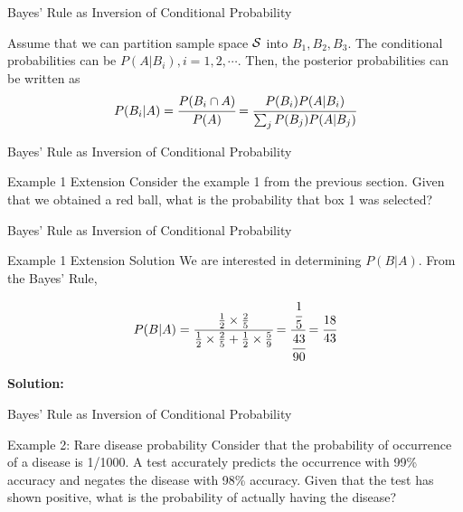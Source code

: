 \documentclass[aspectratio=169,xcolor=dvipsnames,svgnames,x11names,fleqn]{beamer}
\newcommand{\showanswers}{yes}
\begin{document}
    
    \begin{frame}[containsverbatim]{Bayes' Rule as Inversion of Conditional Probability}
    
    Assume that we can partition sample space ${\mathcal S}$ into $B_1, B_2, B_3$. The conditional probabilities can be $P(A|B_i), i = 1, 2, \cdots.$ Then, the posterior probabilities can be written as 
    \begin{equation}
        P(B_i | A) = \cfrac{P(B_i \cap A)}{P(A)} = \cfrac{P(B_i)P(A|B_i)}{\sum_j P(B_j)P(A|B_j)}
    \end{equation}

\end{frame}

\begin{frame}[containsverbatim]{Bayes' Rule as Inversion of Conditional Probability}
    
    \begin{exampleblock}{Example 1 Extension}
        Consider the example 1 from the previous section. Given that we obtained a red ball, what is the probability that box 1 was selected?
    \end{exampleblock}
    
\end{frame}

\begin{frame}[containsverbatim]{Bayes' Rule as Inversion of Conditional Probability}
    \ifthenelse{\equal{\showanswers}{yes}}
{
    \begin{examplesolution}{Example 1 Extension Solution}
        We are interested in determining $P(B|A)$. From the Bayes' Rule, 
    
        \begin{equation}
            P(B|A) = \cfrac{\frac{1}{2}\times \frac{2}{5}}{\frac{1}{2}\times \frac{2}{5} + \frac{1}{2}\times \frac{5}{9}} = \cfrac{\cfrac{1}{5}}{\cfrac{43}{90}} = \cfrac{18}{43}
        \end{equation}
    \end{examplesolution}
}{
    \textbf{Solution:} \color{LightGray}{Blank space for calculation}
}
\end{frame}

\begin{frame}[containsverbatim]{Bayes' Rule as Inversion of Conditional Probability}
    
    \begin{exampleblock}{Example 2: Rare disease probability}
        Consider that the probability of occurrence of a disease is 1/1000. A test accurately predicts the occurrence with 99\% accuracy and negates the disease with 98\% accuracy. Given that the test has shown positive, what is the probability of actually having the disease?
    \end{exampleblock}
    
\end{frame}
\end{document}
